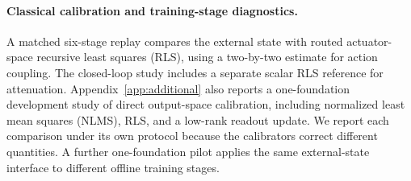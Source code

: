 \paragraph{Classical calibration and training-stage diagnostics.}
A matched six-stage replay compares the external state with routed actuator-space
recursive least squares (RLS), using a two-by-two estimate for action coupling.
The closed-loop study includes a separate scalar RLS reference for attenuation.
Appendix~\ref{app:additional} also reports a one-foundation development study
of direct output-space calibration, including normalized least mean squares
(NLMS), RLS, and a low-rank readout update. We report each comparison under its own protocol because the calibrators
correct different quantities.
A further one-foundation pilot applies the same external-state interface to
different offline training stages.
